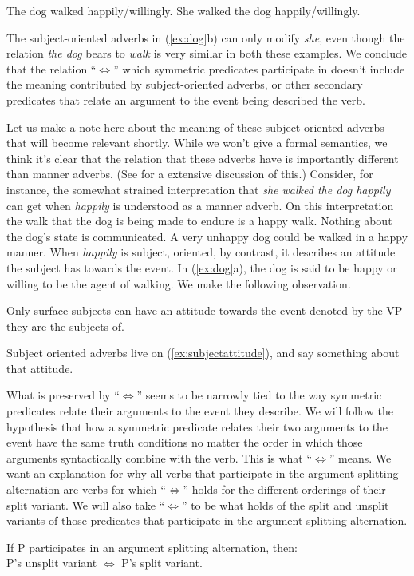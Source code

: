 \documentclass[twoside, 12pt]{article}
\begin{document}
\begin{exe}
\raggedright
  \ex \label{ex:dog}
  \begin{xlist}
    \ex The dog walked happily/willingly.
    \ex She walked the dog happily/willingly.
  \end{xlist}
\end{exe}
The subject-oriented adverbs in (\ref{ex:dog}b) can only modify \textit{she}, even though the relation \textit{the dog} bears to \textit{walk} is very similar in both these examples. We conclude that the relation ``$\Leftrightarrow$'' which symmetric predicates participate in doesn't include the meaning contributed by  subject-oriented adverbs, or other secondary predicates that relate an argument to the event being described the verb.

Let us make a note here about the meaning of these subject oriented adverbs that will become relevant shortly. While we won't give a formal semantics, we think it's clear that the relation that these adverbs have is importantly different than manner adverbs. (See \citealt{Geuder:2002} for a extensive discussion of this.) Consider, for instance, the somewhat strained interpretation that \textit{she walked the dog happily} can get when \textit{happily} is understood as a manner adverb. On this interpretation the walk that the dog is being made to endure is a happy walk. Nothing about the dog's state is communicated. A very unhappy dog could be walked in a happy manner. When \textit{happily} is subject, oriented, by contrast, it describes an attitude the subject has towards the event. In (\ref{ex:dog}a), the dog is said to be happy or willing to be the agent of walking. We make the following observation.
\begin{exe}
\raggedright
  \ex \label{ex:subjectattitude} Only surface subjects can have an attitude towards the event denoted by the VP they are the subjects of.
\end{exe}
Subject oriented adverbs live on (\ref{ex:subjectattitude}), and say something about that attitude.

What is preserved by ``$\Leftrightarrow$'' seems to be narrowly tied to the way symmetric predicates relate their arguments to the event they describe. We will follow the hypothesis that how a symmetric predicate relates their two arguments to the event have the same truth conditions no matter the order in which those arguments syntactically combine with the verb. This is what ``$\Leftrightarrow$'' means. We want an explanation for why all verbs that participate in the argument splitting alternation are verbs for which ``$\Leftrightarrow$'' holds for the different orderings of their split variant. We will also take ``$\Leftrightarrow$'' to be what holds of the split and unsplit variants of those predicates that participate in the argument splitting alternation.
\begin{exe}
\raggedright
  \ex \label{ex:rvaf} If P participates in an argument splitting alternation, then:\\ P's unsplit variant $\Leftrightarrow$ P's split variant.
\end{exe}
\end{document}
